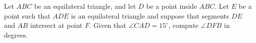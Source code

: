 Let $ABC$ be an equilateral triangle, and let $D$ be a point inside $ABC$. Let $E$ be a point such that $ADE$ is an equilateral triangle and suppose that segments $DE$ and $AB$ intersect at point $F$. Given that $\angle CAD = 15^\circ$, compute $\angle DFB$ in degrees.
